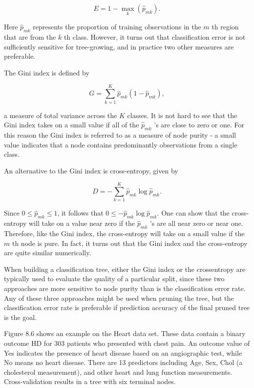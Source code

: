 \documentclass[10pt]{article}
\begin{document}


\begin{equation*}
E=1-\max _{k}\left(\hat{p}_{m k}\right) . \tag{8.5}
\end{equation*}


Here $\hat{p}_{m k}$ represents the proportion of training observations in the $m$ th region that are from the $k$ th class. However, it turns out that classification error is not sufficiently sensitive for tree-growing, and in practice two other measures are preferable.

The Gini index is defined by


\begin{equation*}
G=\sum_{k=1}^{K} \hat{p}_{m k}\left(1-\hat{p}_{m k}\right), \tag{8.6}
\end{equation*}


a measure of total variance across the $K$ classes. It is not hard to see that the Gini index takes on a small value if all of the $\hat{p}_{m k}$ 's are close to zero or one. For this reason the Gini index is referred to as a measure of node purity - a small value indicates that a node contains predominantly observations from a single class.

An alternative to the Gini index is cross-entropy, given by


\begin{equation*}
D=-\sum_{k=1}^{K} \hat{p}_{m k} \log \hat{p}_{m k} . \tag{8.7}
\end{equation*}


Since $0 \leq \hat{p}_{m k} \leq 1$, it follows that $0 \leq-\hat{p}_{m k} \log \hat{p}_{m k}$. One can show that the cross-entropy will take on a value near zero if the $\hat{p}_{m k}$ 's are all near zero or near one. Therefore, like the Gini index, the cross-entropy will take on a small value if the $m$ th node is pure. In fact, it turns out that the Gini index and the cross-entropy are quite similar numerically.

When building a classification tree, either the Gini index or the crossentropy are typically used to evaluate the quality of a particular split, since these two approaches are more sensitive to node purity than is the classification error rate. Any of these three approaches might be used when pruning the tree, but the classification error rate is preferable if prediction accuracy of the final pruned tree is the goal.

Figure 8.6 shows an example on the Heart data set. These data contain a binary outcome HD for 303 patients who presented with chest pain. An outcome value of Yes indicates the presence of heart disease based on an angiographic test, while No means no heart disease. There are 13 predictors including Age, Sex, Chol (a cholesterol measurement), and other heart and lung function measurements. Cross-validation results in a tree with six terminal nodes.
\end{document}
